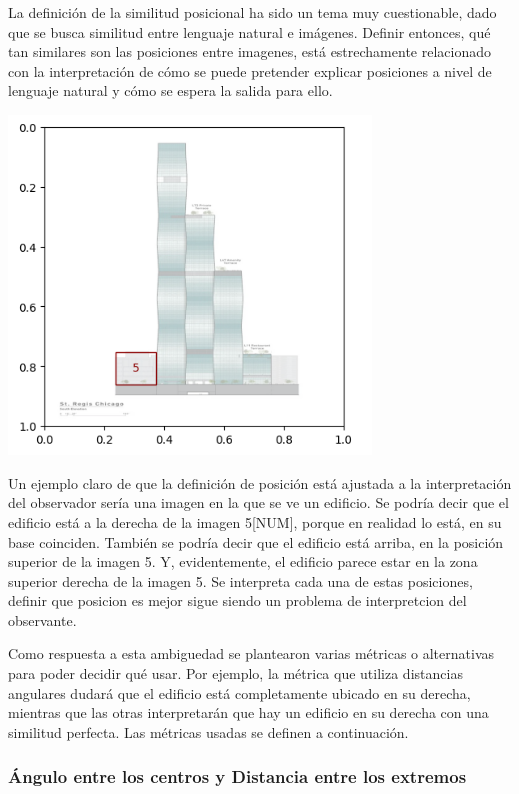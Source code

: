 La definición de la similitud posicional ha sido un tema muy cuestionable, dado que se busca similitud entre lenguaje natural e imágenes. Definir entonces, qu\'e tan similares son las posiciones entre imagenes, está estrechamente relacionado con la interpretación de cómo se puede pretender explicar posiciones a nivel de lenguaje natural y cómo se espera la salida para ello.

\begin{adjustbox}{valign=c, left}
\includegraphics[height=90mm]{Graphics/building.png}
\end{adjustbox}
Un ejemplo claro de que la definición de posición está ajustada a la interpretación del observador sería una imagen en la que se ve un edificio. Se podría decir que el edificio está a la derecha de la imagen 5[NUM], porque en realidad lo está, en su base coinciden. También se podría decir que el edificio está arriba, en la posición superior de la imagen 5. Y, evidentemente, el edificio parece estar en la zona superior derecha de la imagen 5. Se interpreta cada una de estas posiciones, definir que posicion es mejor sigue siendo un problema de interpretcion del observante.

Como respuesta a esta ambiguedad se plantearon varias métricas o alternativas para poder decidir qué usar. Por ejemplo, la métrica que utiliza distancias angulares dudará que el edificio está completamente ubicado en su derecha, mientras que las otras interpretarán que hay un edificio en su derecha con una similitud perfecta. Las métricas usadas se definen a continuación.

\subsubsection{Ángulo entre los centros y Distancia entre los extremos}

